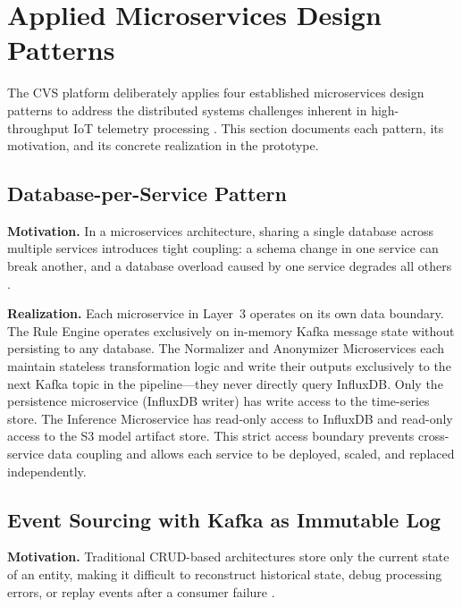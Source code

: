 \documentclass[conference]{IEEEtran}
\begin{document}
\section{Applied Microservices Design Patterns}

The CVS platform deliberately applies four established microservices design patterns
to address the distributed systems challenges inherent in high-throughput IoT telemetry
processing \cite{b28,b29}. This section documents each pattern, its motivation, and
its concrete realization in the prototype.

\subsection{Database-per-Service Pattern}

\textbf{Motivation.} In a microservices architecture, sharing a single database across
multiple services introduces tight coupling: a schema change in one service can break
another, and a database overload caused by one service degrades all others \cite{b29}.

\textbf{Realization.} Each microservice in Layer~3 operates on its own data boundary.
The Rule Engine operates exclusively on in-memory Kafka message state without
persisting to any database. The Normalizer and Anonymizer Microservices each maintain
stateless transformation logic and write their outputs exclusively to the next Kafka
topic in the pipeline---they never directly query InfluxDB. Only the persistence
microservice (InfluxDB writer) has write access to the time-series store. The Inference
Microservice has read-only access to InfluxDB and read-only access to the S3 model
artifact store. This strict access boundary prevents cross-service data coupling
and allows each service to be deployed, scaled, and replaced independently.

\subsection{Event Sourcing with Kafka as Immutable Log}

\textbf{Motivation.} Traditional CRUD-based architectures store only the current state
of an entity, making it difficult to reconstruct historical state, debug processing
errors, or replay events after a consumer failure \cite{b28}.
\end{document}
